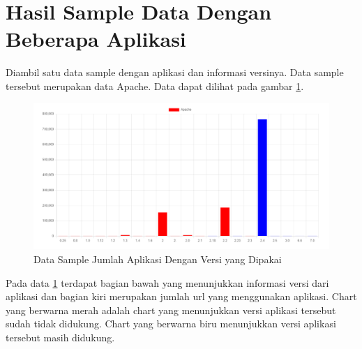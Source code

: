 \section{Hasil Sample Data Dengan Beberapa Aplikasi}
Diambil satu data sample dengan aplikasi dan informasi versinya. Data sample tersebut merupakan data Apache. Data dapat dilihat pada gambar \ref{fig:data_sample_res}.
\begin{figure}[H]
\centering  
\includegraphics[scale=0.7]{Gambar/apache.PNG}  
\caption{Data Sample Jumlah Aplikasi Dengan Versi yang Dipakai} 
\label{fig:data_sample_res} 
\end{figure}
Pada data \ref{fig:data_sample_res} terdapat bagian bawah yang menunjukkan informasi versi dari aplikasi dan bagian kiri merupakan jumlah url yang menggunakan aplikasi. Chart yang berwarna merah adalah chart yang menunjukkan versi aplikasi tersebut sudah tidak didukung. Chart yang berwarna biru menunjukkan versi aplikasi tersebut masih didukung.